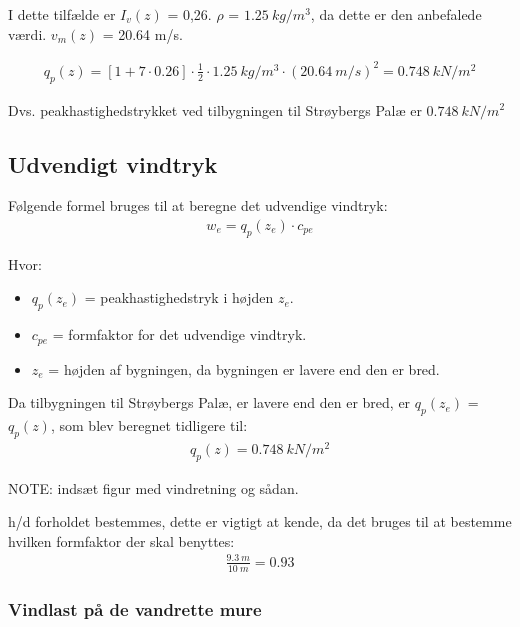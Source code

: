 I dette tilfælde er $ I_{v}(z) $ = 0,26. $ \rho $ = $ \SI{1,25}{kg/m^3} $, da dette er den anbefalede værdi. $ v_{m}(z) $ = 20.64 m/s.

\begin{align*}
q_{p}(z) = [1 + 7 \cdot 0.26] \cdot \frac{1}{2} \cdot \SI{1,25}{kg/m^3} \cdot (\SI{20,64}{m/s})^2 = \SI{0,748}{kN/m^2}
\end{align*}

Dvs. peakhastighedstrykket ved tilbygningen til Strøybergs Palæ er $ \SI{0,748}{kN/m^2} $











\subsection{Udvendigt vindtryk}

Følgende formel bruges til at beregne det udvendige vindtryk:
\begin{align*}
w_{e} = q_{p}(z_{e}) \cdot c_{pe}
\end{align*}

Hvor:
\begin{itemize}
\item $ q_{p}(z_{e}) $ = peakhastighedstryk i højden $ z_{e} $.
\item $ c_{pe} $ = formfaktor for det udvendige vindtryk.
\item $ z_{e} $ = højden af bygningen, da bygningen er lavere end den er bred.
\end{itemize}

Da tilbygningen til Strøybergs Palæ, er lavere end den er bred, er $ q_{p}(z_{e}) $ = $ q_{p}(z) $, som blev beregnet tidligere til:
\begin{align*}
q_{p}(z) = \SI{0,748}{kN/m^2}
\end{align*}

NOTE: indsæt figur med vindretning og sådan.

h/d forholdet bestemmes, dette er vigtigt at kende, da det bruges til at bestemme hvilken formfaktor der skal benyttes:
\begin{align*}
\frac{\SI{9,3}{m}}{\SI{10}{m}} = 0.93
\end{align*}




\subsubsection{Vindlast på de vandrette mure}

